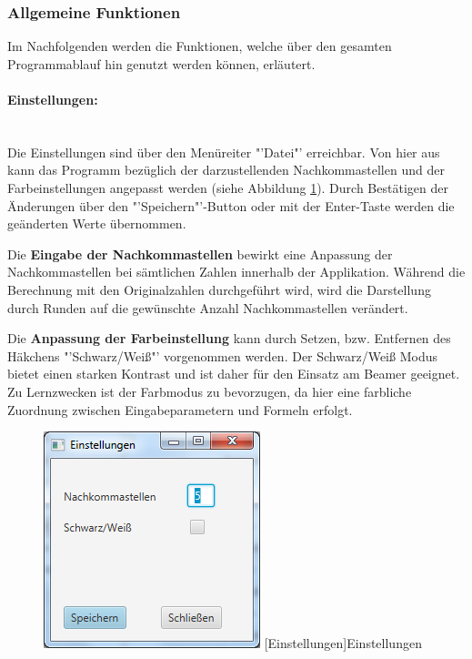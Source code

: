 \subsubsection{Allgemeine Funktionen}
Im Nachfolgenden werden die Funktionen, welche über den gesamten Programmablauf hin genutzt werden können, erläutert.

\paragraph{Einstellungen:}~\\
\label{par:einstellungen}
Die Einstellungen sind über den Menüreiter "'Datei"' erreichbar. Von hier aus kann das Programm bezüglich der darzustellenden Nachkommastellen und der Farbeinstellungen angepasst werden (siehe Abbildung \ref{fig:einstellungen}). Durch Bestätigen der Änderungen über den "'Speichern"'-Button oder mit der Enter-Taste werden die geänderten Werte übernommen.

Die \textbf{Eingabe der Nachkommastellen} bewirkt eine Anpassung der Nachkommastellen bei sämtlichen Zahlen innerhalb der Applikation. Während die Berechnung mit den Originalzahlen durchgeführt wird, wird die Darstellung durch Runden auf die gewünschte Anzahl Nachkommastellen verändert. 

Die \textbf{Anpassung der Farbeinstellung} kann durch Setzen, bzw. Entfernen des Häkchens "'Schwarz/Weiß"' vorgenommen werden. Der Schwarz/Weiß Modus bietet einen starken Kontrast und ist daher für den Einsatz am Beamer geeignet. Zu Lernzwecken ist der Farbmodus zu bevorzugen, da hier eine farbliche Zuordnung zwischen Eingabeparametern und Formeln erfolgt.

\begin{figure}[H]
	\centering
	\includegraphics[width=0.3\linewidth]{Bilder/Einstellungen.png} 
	[Einstellungen]{Einstellungen}
	\label{fig:einstellungen}
\end{figure}

